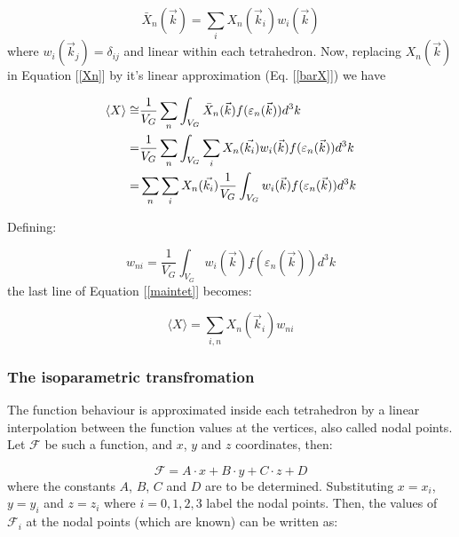 \documentclass[10pt]{article}
\begin{document}
\begin{equation}\label{barX}
\bar{X}_n(\vec{k})=\sum\limits_i{X_n(\vec{k}_i)w_i(\vec{k})}
\end{equation}
where $w_i(\vec{k}_j)=\delta_{ij}$ and linear within each tetrahedron. Now, replacing $X_n(\vec{k})$ in
Equation [\ref{Xn}] by it's linear approximation (Eq. [\ref{barX}]) we have

\begin{equation}\label{maintet}
\begin{align}
\langle X\rangle\cong&\frac{1}{V_G}\sum\limits_n{\int_{V_G}{\bar{X}_n(\vec{k})%
f(\varepsilon_n(\vec{k}))d^3k}}\\
=&\frac{1}{V_G}\sum\limits_n{\int_{V_G}{\sum\limits_i{X_n(\vec{k_i})%
w_i(\vec{k})f(\varepsilon_n(\vec{k}))d^3k}}}\\
=&\sum\limits_n{\sum\limits_i{X_n(\vec{k_i})\frac{1}{V_G}\int_{V_G}{%
w_i(\vec{k})f(\varepsilon_n(\vec{k}))d^3k}}}
\end{align}
\end{equation}

Defining:

\begin{equation}\label{weight}
w_{ni}=\frac{1}{V_G}\int_{V_G}{w_i(\vec{k})f(\varepsilon_n(\vec{k}))d^3k}
\end{equation}
the last line of Equation [\ref{maintet}] becomes:

\begin{equation}\label{wsum}
\langle X\rangle=\sum\limits_{i,n}{X_n(\vec{k}_i) w_{ni}}
\end{equation}

\subsubsection{The isoparametric transfromation}

The function behaviour is approximated inside each tetrahedron by a linear interpolation between the
function values at the vertices, also called nodal points. Let $\mathcal{F}$ be such a function, and $x$,
$y$ and $z$ coordinates, then:

\begin{equation}\label{mf}
\mathcal{F}= A\cdot x+B \cdot y +C \cdot z + D
\end{equation}
where the constants $A$, $B$, $C$ and $D$ are to be determined. Substituting $x=x_i$, $y=y_i$ and $z=z_i$
where $i=0,1,2,3$ label the nodal points. Then, the values of $\mathcal{F}_i$ at the nodal points (which
are known) can be written as:
\end{document}

